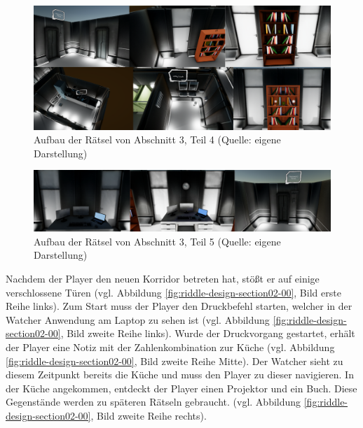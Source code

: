 \begin{figure}[ht]
\centering
\includegraphics[width=1\linewidth]{content/pictures/Rätseldesign - Abschnitt02 - Rätsel03.png}
\caption{Aufbau der Rätsel von Abschnitt 3, Teil 4 (Quelle: eigene Darstellung)}
\label{fig:riddle-design-section02-03}
\end{figure}

\begin{figure}[ht]
\centering
\includegraphics[width=1\linewidth]{content/pictures/Rätseldesign - Abschnitt02 - Rätsel04.png}
\caption{Aufbau der Rätsel von Abschnitt 3, Teil 5 (Quelle: eigene Darstellung)}
\label{fig:riddle-design-section02-04}
\end{figure}

Nachdem der Player den neuen Korridor betreten hat, stößt er auf einige verschlossene Türen (vgl. Abbildung \ref{fig:riddle-design-section02-00}, Bild erste Reihe links). Zum Start muss der Player den Druckbefehl starten, welcher in der Watcher Anwendung am Laptop zu sehen ist (vgl. Abbildung \ref{fig:riddle-design-section02-00}, Bild zweite Reihe links). Wurde der Druckvorgang gestartet, erhält der Player eine Notiz mit der Zahlenkombination zur Küche (vgl. Abbildung \ref{fig:riddle-design-section02-00}, Bild zweite Reihe Mitte). Der Watcher sieht zu diesem Zeitpunkt bereits die Küche und muss den Player zu dieser  navigieren. In der Küche angekommen, entdeckt der Player einen Projektor und ein Buch. Diese Gegenstände werden zu späteren Rätseln gebraucht. (vgl. Abbildung \ref{fig:riddle-design-section02-00}, Bild zweite Reihe rechts). 

